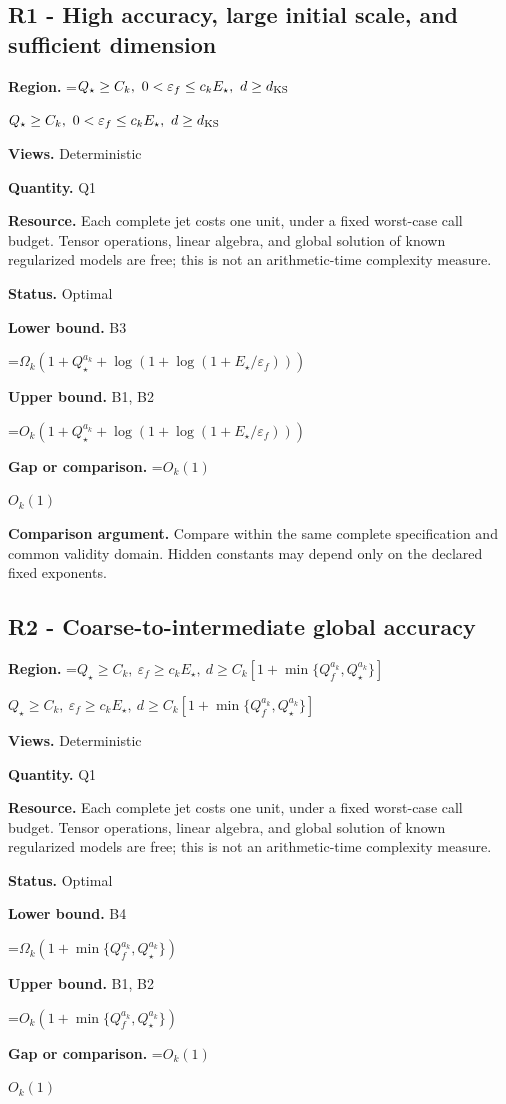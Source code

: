\documentclass[10pt,a4paper]{article}
\newcommand{\AtlasMath}[1]{\par\begingroup\centering\setbox0=\hbox{$\displaystyle #1$}\ifdim\wd0>1.4\linewidth\typeout{ATLAS WIDE FORMULA: \the\wd0}\fi\ifdim\wd0>\linewidth\resizebox{\linewidth}{!}{\box0}\else\box0\fi\par\endgroup}
\newcommand{\AtlasInlineMath}[1]{\begingroup\setbox0=\hbox{$#1$}\ifdim\wd0>.4\linewidth\endgroup\AtlasMath{#1}\else\endgroup$#1$\fi}
\begin{document}
\subsection{R1 - High accuracy, large initial scale, and sufficient dimension}
\textbf{Region.} \AtlasInlineMath{Q_\star\ge C_k,\ 0<\varepsilon_f\le c_k E_\star,\ d\ge d_{\rm KS}}

\textbf{Views.} Deterministic

\textbf{Quantity.} Q1

\textbf{Resource.} Each complete jet costs one unit, under a fixed worst-case call budget. Tensor operations, linear algebra, and global solution of known regularized models are free; this is not an arithmetic-time complexity measure.

\textbf{Status.} Optimal

\textbf{Lower bound.} B3

\AtlasMath{\Omega_k(1+Q_\star^{a_k}+\log(1+\log(1+E_\star/\varepsilon_f)))}
\textbf{Upper bound.} B1, B2

\AtlasMath{O_k(1+Q_\star^{a_k}+\log(1+\log(1+E_\star/\varepsilon_f)))}
\textbf{Gap or comparison.} \AtlasInlineMath{O_k(1)}

\textbf{Comparison argument.} Compare within the same complete specification and common validity domain. Hidden constants may depend only on the declared fixed exponents.

\subsection{R2 - Coarse-to-intermediate global accuracy}
\textbf{Region.} \AtlasInlineMath{Q_\star\ge C_k,\ \varepsilon_f\ge c_kE_\star,\ d\ge C_k[1+\min\{Q_f^{a_k},Q_\star^{a_k}\}]}

\textbf{Views.} Deterministic

\textbf{Quantity.} Q1

\textbf{Resource.} Each complete jet costs one unit, under a fixed worst-case call budget. Tensor operations, linear algebra, and global solution of known regularized models are free; this is not an arithmetic-time complexity measure.

\textbf{Status.} Optimal

\textbf{Lower bound.} B4

\AtlasMath{\Omega_k(1+\min\{Q_f^{a_k},Q_\star^{a_k}\})}
\textbf{Upper bound.} B1, B2

\AtlasMath{O_k(1+\min\{Q_f^{a_k},Q_\star^{a_k}\})}
\textbf{Gap or comparison.} \AtlasInlineMath{O_k(1)}
\end{document}
